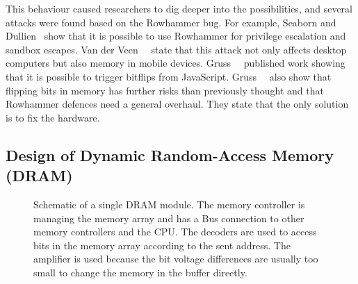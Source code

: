 This behaviour caused researchers to dig deeper into the possibilities, and
several attacks were found based on the Rowhammer bug. For example, Seaborn and
Dullien~\cite{projectzerorow} show that it is possible to use Rowhammer for
privilege escalation and sandbox escapes. Van der Veen~\etal~\cite{drammer}
state that this attack not only affects desktop computers but also memory in
mobile devices. Gruss~\etal~\cite{rowhammerjs} published work showing that it is
possible to trigger bitflips from JavaScript. Gruss~\etal~\cite{flipinthewall}
also show that flipping bits in memory has further risks than previously thought
and that Rowhammer defences need a general overhaul. They state that the only
solution is to fix the hardware.

\subsection{Design of Dynamic Random-Access Memory (DRAM)}

\begin{figure}[!htb]
  \centering
  \caption{Schematic of a single DRAM module. The memory controller is managing
the memory array and has a Bus connection to other memory controllers and the
CPU. The decoders are used to access bits in the memory array according to the
sent address. The amplifier is used because the bit voltage differences are
usually too small to change the memory in the buffer directly.}
  \label{fig:DRAMscheme}
\end{figure}

